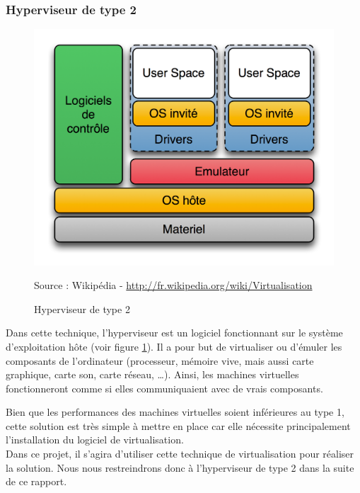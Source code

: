 
\subsubsection{Hyperviseur de type 2}

\begin{figure}[!h]
	\center
	\includegraphics[scale=0.7]{img/Hyperviseur_type2.png}
	\caption{Hyperviseur de type 2}
	Source : Wikipédia - \href{http://fr.wikipedia.org/wiki/Virtualisation}{http://fr.wikipedia.org/wiki/Virtualisation}
	\label{Schéma Hyperviseur 2}
\end{figure}

Dans cette technique, l'hyperviseur est un logiciel fonctionnant sur le système d'exploitation hôte (voir figure \ref{Schéma Hyperviseur 2}).
Il a pour but de virtualiser ou d'émuler les composants de l'ordinateur (processeur, mémoire vive, mais aussi carte graphique, carte son, carte réseau, \ldots).
Ainsi, les machines virtuelles fonctionneront comme si elles communiquaient avec de vrais composants.

Bien que les performances des machines virtuelles soient inférieures au type 1, cette solution est très simple à mettre en place car elle nécessite principalement l'installation du logiciel de virtualisation.
\\


Dans ce projet, il s'agira d'utiliser cette technique de virtualisation pour réaliser la solution.
Nous nous restreindrons donc à l'hyperviseur de type 2 dans la suite de ce rapport.
\\




